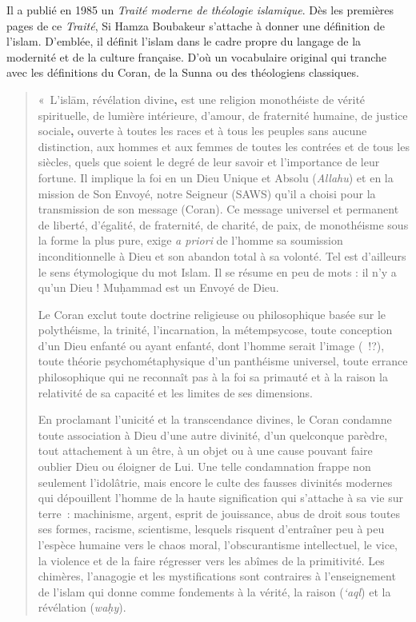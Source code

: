 Il a publié en 1985 un \emph{Traité moderne de théologie islamique}. Dès
les premières pages de ce \emph{Traité}, Si Hamza Boubakeur s'attache à
donner une définition de l'islam. D'emblée, il définit l'islam dans le
cadre propre du langage de la modernité et de la culture française. D'où
un vocabulaire original qui tranche avec les définitions du Coran, de la
Sunna ou des théologiens classiques.

\begin{quote}
    
«~L'islām, révélation divine\textbf{,} est une religion monothéiste de
vérité spirituelle, de lumière intérieure, d'amour, de fraternité
humaine, de justice sociale\textbf{,} ouverte à toutes les races et à
tous les peuples sans aucune distinction, aux hommes et aux femmes de
toutes les contrées et de tous les siècles, quels que soient le degré de
leur savoir et l'importance de leur fortune. Il implique la foi en un
Dieu Unique et Absolu (\emph{Allahu}) et en la mission de Son Envoyé,
notre Seigneur (SAWS) qu'il a choisi pour la transmission de son message
(Coran). Ce message universel et permanent de liberté, d'égalité, de
fraternité, de charité, de paix, de monothéisme sous la forme la plus
pure, exige \emph{a priori} de l'homme sa soumission inconditionnelle à
Dieu et son abandon total à sa volonté. Tel est d'ailleurs le sens
étymologique du mot Islam. Il se résume en peu de mots : il n'y a qu'un
Dieu ! Muḥammad est un Envoyé de Dieu.

Le Coran exclut toute doctrine religieuse ou philosophique basée sur le
polythéisme, la trinité, l'incarnation, la métempsycose, toute
conception d'un Dieu enfanté ou ayant enfanté, dont l'homme serait
l'image (~!?), toute théorie psychométaphysique d'un panthéisme
universel, toute errance philosophique qui ne reconnaît pas à la foi sa
primauté et à la raison la relativité de sa capacité et les limites de
ses dimensions.

En proclamant l'unicité et la transcendance divines, le Coran condamne
toute association à Dieu d'une autre divinité, d'un quelconque
parèdre, tout attachement à un
être, à un objet ou à une cause pouvant faire oublier Dieu ou éloigner
de Lui. Une telle condamnation frappe non seulement l'idolâtrie, mais
encore le culte des fausses divinités modernes qui dépouillent l'homme
de la haute signification qui s'attache à sa vie sur terre~: machinisme,
argent, esprit de jouissance, abus de droit sous toutes ses formes,
racisme, scientisme, lesquels risquent d'entraîner peu à peu l'espèce
humaine vers le chaos moral, l'obscurantisme intellectuel, le vice, la
violence et de la faire régresser vers les abîmes de la primitivité. Les
chimères, l'anagogie et les mystifications sont
contraires à l'enseignement de l'islam qui donne comme fondements à la
vérité, la raison (\emph{`aql}) et la révélation (\emph{waḥy}).


\end{quote}
